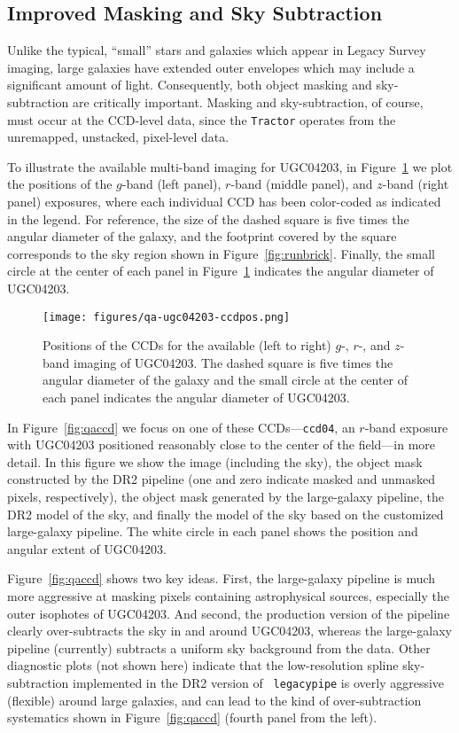 \subsection{Improved Masking and Sky Subtraction}\label{sec:sky}

Unlike the typical, ``small'' stars and galaxies which appear in Legacy Survey
imaging, large galaxies have extended outer envelopes which may include a
significant amount of light.  Consequently, both object masking and
sky-subtraction are critically important.  Masking and sky-subtraction, of
course, must occur at the CCD-level data, since the {\tt Tractor} operates from
the unremapped, unstacked, pixel-level data.

To illustrate the available multi-band imaging for UGC04203, in
Figure~\ref{fig:ccdpos} we plot the positions of the $g$-band (left panel),
$r$-band (middle panel), and $z$-band (right panel) exposures, where each
individual CCD has been color-coded as indicated in the legend.  For reference,
the size of the dashed square is five times the angular diameter of the galaxy,
and the footprint covered by the square corresponds to the sky region shown in
Figure~\ref{fig:runbrick}.  Finally, the small circle at the center of each
panel in Figure~\ref{fig:ccdpos} indicates the angular diameter of UGC04203.

\begin{figure}%
\centering
\texttt{[image: figures/qa-ugc04203-ccdpos.png]}
\caption{Positions of the CCDs for the available (left to right) $g$-, $r$-, and
  $z$-band imaging of UGC04203.  The dashed square is five times the angular
  diameter of the galaxy and the small circle at the center of each panel
  indicates the angular diameter of UGC04203.  \label{fig:ccdpos}}
\end{figure}

In Figure~\ref{fig:qaccd} we focus on one of these CCDs---{\tt ccd04}, an
$r$-band exposure with UGC04203 positioned reasonably close to the center of the
field---in more detail.  In this figure we show the image (including the
sky), the object mask constructed by the DR2 pipeline (one and zero indicate
masked and unmasked pixels, respectively), the object mask generated by the
large-galaxy pipeline, the DR2 model of the sky, and finally the model of the
sky based on the customized large-galaxy pipeline.  The white circle in each
panel shows the position and angular extent of UGC04203.

Figure~\ref{fig:qaccd} shows two key ideas.  First, the large-galaxy pipeline is
much more aggressive at masking pixels containing astrophysical sources,
especially the outer isophotes of UGC04203.  And second, the production version
of the pipeline clearly over-subtracts the sky in and around UGC04203, whereas
the large-galaxy pipeline (currently) subtracts a uniform sky background from
the data.  Other diagnostic plots (not shown here) indicate that the
low-resolution spline sky-subtraction implemented in the DR2 version of {\tt
  legacypipe} is overly aggressive (flexible) around large galaxies, and can
lead to the kind of over-subtraction systematics shown in Figure~\ref{fig:qaccd}
(fourth panel from the left).

